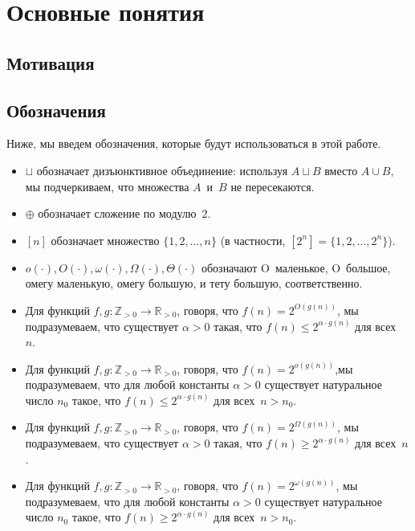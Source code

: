 \section{Основные понятия}

\subsection{Мотивация}
\label{section:generalsetting}

\subsection{Обозначения}

Ниже, мы введем обозначения, которые будут использоваться в этой работе.

\begin{itemize}
	\item $\sqcup$ обозначает дизъюнктивное объединение: используя $A\sqcup B$ вместо $A\cup B$, мы подчеркиваем, что множества $A$~и~$B$ не пересекаются. 
	\item $\oplus$ обозначает сложение по модулю~$2$.
	\item $[n]$ обозначает множество $\{1, 2, \dotsc, n\}$ (в частности, $[2^n] = \{1, 2, \dotsc, 2^n\}$).
	\item $o(\cdot), O(\cdot), \omega(\cdot), \Omega(\cdot), \Theta(\cdot)$ обозначают O~маленькое, 
	O~большое, омегу маленькую, омегу большую, и тету большую, соответственно.
	\item Для функций $f,g \colon \mathbb{Z}_{>0} \to \mathbb{R}_{>0}$, говоря, что $f(n) = 2^{O(g(n))}$, мы подразумеваем, что существует $\alpha > 0$ такая, что
	$f(n) \le 2^{\alpha \cdot g(n)}$ 
	для всех ~$n$.
	\item Для функций $f,g \colon \mathbb{Z}_{>0} \to \mathbb{R}_{>0}$, говоря, что $f(n) = 2^{o(g(n))}$,мы подразумеваем, что для любой константы $\alpha > 0$ существует натуральное число $n_0$ такое, что
	$f(n) \le 2^{\alpha \cdot g(n)}$ 
	для всех~$n > n_0$.
	\item Для функций $f,g \colon \mathbb{Z}_{>0} \to \mathbb{R}_{>0}$, говоря, что $f(n) = 2^{\Omega(g(n))}$, мы подразумеваем, что существует $\alpha > 0$ такая, что 
	$f(n) \ge 2^{\alpha \cdot g(n)}$ 
	для всех~$n$.
	\item Для функций $f,g \colon \mathbb{Z}_{>0} \to \mathbb{R}_{>0}$, говоря, что $f(n) = 2^{\omega(g(n))}$, мы подразумеваем, что для любой константы $\alpha > 0$ существует натуральное число $n_0$ такое, что 
	$f(n) \ge 2^{\alpha \cdot g(n)}$ 
	для всех~$n > n_0$.
\end{itemize}

